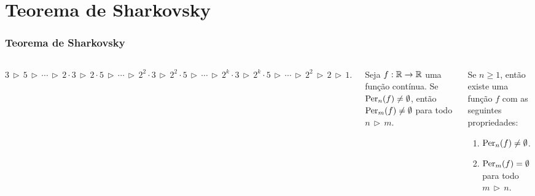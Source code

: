 \section{Teorema de Sharkovsky}


\begin{frame}
\vspace{5pt}
\frametitle{Teorema de Sharkovsky}
\begin{columns}
\column{\dimexpr\paperwidth-15pt}

\begin{definition}
$3 \, \triangleright \, 5 
\, \triangleright \, \cdots \, \triangleright \,
2 \cdot 3 \, \triangleright \, 2 \cdot 5 
\, \triangleright \, \cdots \, \triangleright \,
2^2 \cdot 3 \, \triangleright \, 2^2 \cdot 5
\, \triangleright \, \cdots \, \triangleright \,
2^k \cdot 3 \, \triangleright \, 2^k \cdot 5
\, \triangleright \, \cdots \, \triangleright \,
2^2 \, \triangleright \, 2 \, \triangleright \, 1.$
\end{definition}

\vspace{10pt}

\begin{theorem}[Sharkovsky]
Seja $f: \mathbb{R} \to \mathbb{R}$ uma função contínua. Se $\operatorname{Per}_n(f) \neq \emptyset$, então $\operatorname{Per}_m(f) \neq \emptyset$ para todo $n \, \triangleright \, m$.
\end{theorem}

\vspace{10pt}

\begin{theorem}
Se $n \geq 1$, então existe uma função $f$ com as seguintes propriedades:
\begin{enumerate}
\item $\operatorname{Per}_n(f) \neq \emptyset$.
\item $\operatorname{Per}_m(f) =  \emptyset$ para todo $m \, \triangleright \, n$.
\end{enumerate}
\end{theorem}

\end{columns}
\end{frame}

%
%
%
%
%
